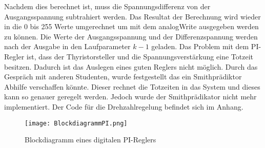 Nachdem dies berechnet ist, muss die Spannungsdifferenz von der Ausgangsspannung subtrahiert werden. Das Resultat der Berechnung wird wieder in die 0 bis 255 Werte umgerechnet um mit dem analogWrite ausgegeben werden zu können. Die Werte der Ausgangsspannung und der Differenzspannung werden nach der Ausgabe in den Laufparameter $k-1$ geladen. Das Problem mit dem PI-Regler ist, dass der Thyristorsteller und die Spannungsverstärkung eine Totzeit besitzen. Dadurch ist das Auslegen eines guten Reglers nicht möglich. Durch das Gespräch mit anderen Studenten, wurde festgestellt das ein Smithprädiktor \cite{Regelungstechnik_Buch} Abhilfe verschaffen könnte. Dieser rechnet die Totzeiten in das System und dieses kann so genauer geregelt werden. Jedoch wurde der Smithprädikator nicht mehr implementiert. Der Code für die Drehzahlregelung befindet sich im Anhang. 

\begin{figure}[ht!]
	\centering
	\texttt{[image: BlockdiagrammPI.png]}	
	\caption{Blockdiagramm eines digitalen PI-Reglers}\label{fig:PIRegler}\cite{PI_Regler}
\end{figure}







